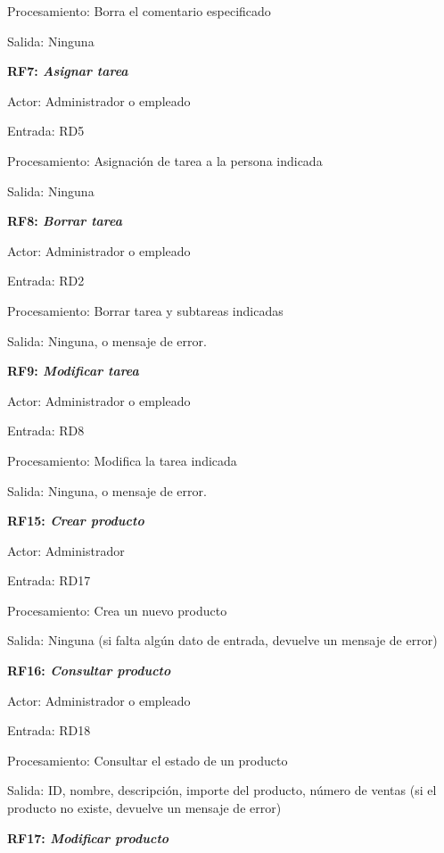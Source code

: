 \documentclass[paper=a4, fontsize=11pt, spanish]{scrartcl}
\begin{document}
	Procesamiento: Borra el comentario especificado
	
	Salida: Ninguna
	
	\setlength{\parindent}{0em}
	\textbf{RF7: \textit{Asignar tarea}}
	\setlength{\parindent}{2em}
	
	Actor: Administrador o empleado
	
	Entrada: RD5
	
	Procesamiento: Asignación de tarea a la persona indicada
	
	Salida: Ninguna
	
	\setlength{\parindent}{0em}
	\textbf{RF8: \textit{Borrar tarea}}
	\setlength{\parindent}{2em}
	
	Actor: Administrador o empleado
	
	Entrada: RD2
	
	Procesamiento: Borrar tarea y subtareas indicadas
	
	Salida: Ninguna, o mensaje de error.
	
	\setlength{\parindent}{0em}
	\textbf{RF9: \textit{Modificar tarea}}
	\setlength{\parindent}{2em}
	
	Actor: Administrador o empleado
	
	Entrada: RD8
	
	Procesamiento: Modifica la tarea indicada
	
	Salida: Ninguna, o mensaje de error.
	
	\setlength{\parindent}{0em}
	\textbf{RF15: \textit{Crear producto}}
	\setlength{\parindent}{2em}
	
	Actor: Administrador
	
	Entrada: RD17
	
	Procesamiento: Crea un nuevo producto
	
	Salida: Ninguna (si falta algún dato de entrada, devuelve un mensaje de error)
	
	\setlength{\parindent}{0em}
	\textbf{RF16: \textit{Consultar producto}}
	\setlength{\parindent}{2em}
	
	Actor: Administrador o empleado
	
	Entrada: RD18
	
	Procesamiento: Consultar el estado de un producto
	
	Salida: ID, nombre, descripción, importe del producto, número de ventas (si el producto no existe, devuelve un mensaje de error)
	
	\setlength{\parindent}{0em}
	\textbf{RF17: \textit{Modificar producto}}
	\setlength{\parindent}{2em}
	
\end{document}
